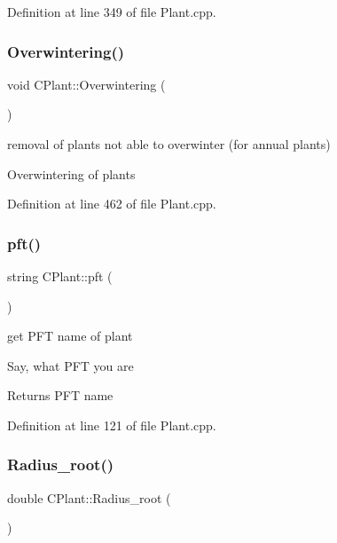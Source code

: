 Definition at line 349 of file Plant.\+cpp.

\mbox{\label{class_c_plant_a80e89c9f8cefee43ac3020974ae0850b}} 
\subsubsection{\texorpdfstring{Overwintering()}{Overwintering()}}
{\footnotesize\ttfamily void C\+Plant\+::\+Overwintering (\begin{DoxyParamCaption}{ }\end{DoxyParamCaption})}



removal of plants not able to overwinter (for annual plants) 

Overwintering of plants 

Definition at line 462 of file Plant.\+cpp.

\mbox{\label{class_c_plant_a911d2b301b01fc5a37945fbca57e96b3}} 
\subsubsection{\texorpdfstring{pft()}{pft()}}
{\footnotesize\ttfamily string C\+Plant\+::pft (\begin{DoxyParamCaption}{ }\end{DoxyParamCaption})\hspace{0.3cm}{\ttfamily [virtual]}}



get P\+FT name of plant 

Say, what P\+FT you are \begin{DoxyReturn}{Returns}
P\+FT name 
\end{DoxyReturn}


Definition at line 121 of file Plant.\+cpp.

\mbox{\label{class_c_plant_a865e74078ea231ec3e4b9396f50bff61}} 
\subsubsection{\texorpdfstring{Radius\_root()}{Radius\_root()}}
{\footnotesize\ttfamily double C\+Plant\+::\+Radius\+\_\+root (\begin{DoxyParamCaption}{ }\end{DoxyParamCaption})}



